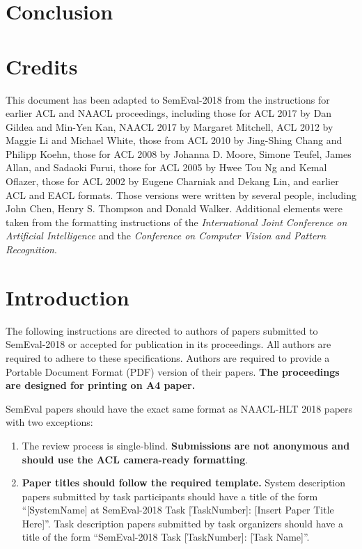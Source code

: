 \documentclass[11pt,a4paper]{article}
\begin{document}
\section{Conclusion}

\section{Credits}

This document has been adapted to SemEval-2018 from the instructions
for earlier ACL and NAACL proceedings,
including those for ACL 2017 by Dan Gildea
and Min-Yen Kan, NAACL 2017 by Margaret
Mitchell, ACL 2012 by Maggie Li and Michael
White, those from ACL 2010 by Jing-Shing Chang
and Philipp Koehn, those for ACL 2008 by Johanna
D. Moore, Simone Teufel, James Allan, and
Sadaoki Furui, those for ACL 2005 by Hwee Tou
Ng and Kemal Oflazer, those for ACL 2002 by Eugene
Charniak and Dekang Lin, and earlier ACL
and EACL formats.
Those versions were written by several
people, including John Chen, Henry S. Thompson and Donald
Walker. Additional elements were taken from the formatting
instructions of the {\em International Joint Conference on Artificial
  Intelligence} and the \emph{Conference on Computer Vision and
  Pattern Recognition}.

\section{Introduction}

The following instructions are directed to authors of papers submitted
to SemEval-2018 or accepted for publication in its proceedings. All
authors are required to adhere to these specifications. Authors are
required to provide a Portable Document Format (PDF) version of their
papers. \textbf{The proceedings are designed for printing on A4
paper.}

SemEval papers should have the exact same format as NAACL-HLT 2018 papers with two exceptions:
\begin{enumerate}
	\item The review process is single-blind. {\bf Submissions are not anonymous and should use the ACL camera-ready formatting}.
	\item {\bf Paper titles should follow the required template.} System description papers submitted by task participants should have a title of the form ``[SystemName] at SemEval-2018 Task [TaskNumber]:  [Insert Paper Title Here]''. Task description papers submitted by task organizers should have a title of the form ``SemEval-2018 Task [TaskNumber]:  [Task Name]''. 
\end{enumerate}
\end{document}

